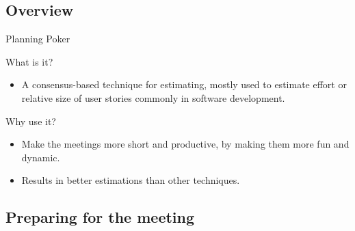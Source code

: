\documentclass[dvips,11pt,xcolor=dvipsnames]{beamer}
\numberwithin{table}{section}
\numberwithin{figure}{section} %
\begin{document}
\subsection{Overview}

\begin{frame}{Planning Poker}
  
  \begin{block}{What is it?}
    \begin{itemize}
    \item A consensus-based technique for estimating, mostly used to estimate effort or relative size of user stories commonly in software development.
    \end{itemize}
  \end{block}

  \begin{exampleblock}{Why use it?}
    \begin{itemize}
    \item Make the meetings more short and productive, by making them more fun and dynamic.
    \item Results in better estimations than other techniques.
    \end{itemize}
  \end{exampleblock}

\end{frame}

\subsection{Preparing for the meeting}
\end{document}
